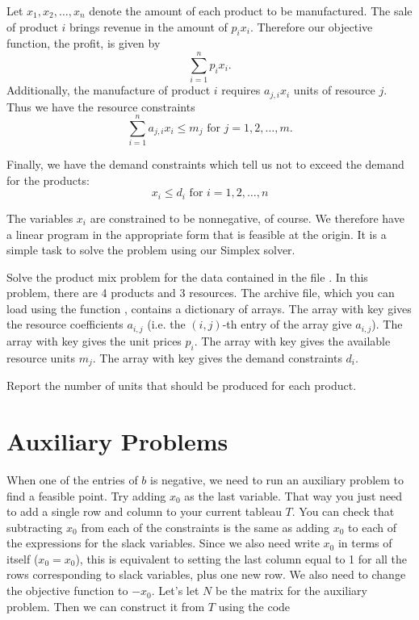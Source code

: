 Let  $x_1, x_2, \ldots, x_n$ denote the amount of each product to be manufactured.
The sale of product $i$ brings revenue in the amount of $p_ix_i$.
Therefore our objective function, the profit, is given by
\[
\sum_{i=1}^n p_ix_i.
\]
Additionally, the manufacture of product $i$ requires $a_{j,i}x_i$ units of resource $j$.
Thus we have the resource constraints
\[
\sum_{i=1}^n a_{j,i}x_i \leq m_j  \text{ for } j = 1, 2, \ldots, m.
\]

Finally, we have the demand constraints which tell us not to exceed the demand for the products:
\[
x_i \leq d_i \text{ for } i = 1, 2, \ldots, n
\]

The variables $x_i$ are constrained to be nonnegative, of course. We therefore have a linear program in the appropriate form that is feasible at the origin.
It is a simple task to solve the problem using our Simplex solver.

\begin{problem}
Solve the product mix problem for the data contained in the file . In this problem, there are 4 products and 3 resources.
The archive file, which you can load using the function
, contains a dictionary of arrays. The array with key  gives the resource coefficients $a_{i,j}$ (i.e. the $(i,j)$-th entry
of the array give $a_{i,j}$). The array with key  gives the unit prices $p_i$. The array with key  gives the available resource
units $m_j$. The array with key  gives the demand constraints $d_i$.

Report the number of units that should be produced for each product.
\end{problem}

\section*{Auxiliary Problems} %

When one of the entries of $b$ is negative, we need to run an auxiliary problem to find a feasible point.
Try adding $x_0$ as the last variable.
That way you just need to add a single row and column to your current tableau $T$.
You can check that subtracting $x_0$ from each of the constraints is the same as adding $x_0$ to each of the expressions for the slack variables.
Since we also need write $x_0$ in terms of itself ($x_0 = x_0$), this is equivalent to setting the last column equal to 1 for all the rows corresponding to slack variables, plus one new row.
We also need to change the objective function to $-x_0$.
Let's let $N$ be the matrix for the auxiliary problem.
Then we can construct it from $T$ using the code

